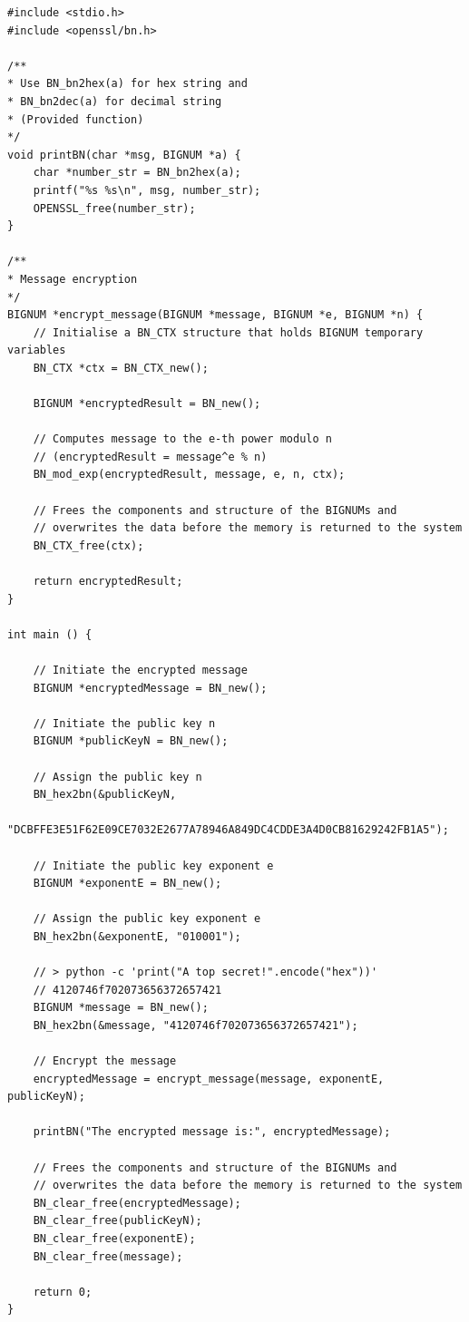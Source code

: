 \documentclass[12pt]{article}
\begin{document}
\begin{lstlisting}
#include <stdio.h>
#include <openssl/bn.h>

/**
* Use BN_bn2hex(a) for hex string and
* BN_bn2dec(a) for decimal string
* (Provided function)
*/
void printBN(char *msg, BIGNUM *a) {
    char *number_str = BN_bn2hex(a);
    printf("%s %s\n", msg, number_str);
    OPENSSL_free(number_str);
}

/**
* Message encryption
*/ 
BIGNUM *encrypt_message(BIGNUM *message, BIGNUM *e, BIGNUM *n) {
    // Initialise a BN_CTX structure that holds BIGNUM temporary variables
    BN_CTX *ctx = BN_CTX_new();
    
    BIGNUM *encryptedResult = BN_new();

    // Computes message to the e-th power modulo n
    // (encryptedResult = message^e % n)
    BN_mod_exp(encryptedResult, message, e, n, ctx);

    // Frees the components and structure of the BIGNUMs and
    // overwrites the data before the memory is returned to the system
    BN_CTX_free(ctx);

    return encryptedResult;
}

int main () {

    // Initiate the encrypted message
    BIGNUM *encryptedMessage = BN_new();

    // Initiate the public key n
    BIGNUM *publicKeyN = BN_new();

    // Assign the public key n
    BN_hex2bn(&publicKeyN,
    "DCBFFE3E51F62E09CE7032E2677A78946A849DC4CDDE3A4D0CB81629242FB1A5");

    // Initiate the public key exponent e
    BIGNUM *exponentE = BN_new();

    // Assign the public key exponent e
    BN_hex2bn(&exponentE, "010001");

    // > python -c 'print("A top secret!".encode("hex"))'
    // 4120746f702073656372657421
    BIGNUM *message = BN_new();
    BN_hex2bn(&message, "4120746f702073656372657421");

    // Encrypt the message
    encryptedMessage = encrypt_message(message, exponentE, publicKeyN);

    printBN("The encrypted message is:", encryptedMessage);

    // Frees the components and structure of the BIGNUMs and
    // overwrites the data before the memory is returned to the system            
    BN_clear_free(encryptedMessage); 
    BN_clear_free(publicKeyN); 
    BN_clear_free(exponentE);
    BN_clear_free(message);

    return 0;
}
\end{lstlisting}
\end{document}

